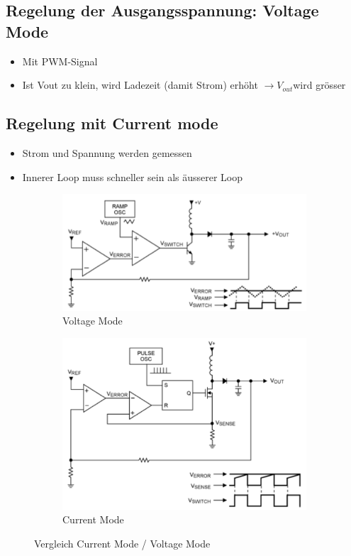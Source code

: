 \subsection{Regelung der Ausgangsspannung: Voltage Mode}
\begin{itemize}
  \item Mit PWM-Signal
  \item Ist Vout zu klein, wird Ladezeit (damit Strom) erhöht $\to V_{out}$wird
  grösser
\end{itemize}

\subsection{Regelung mit Current mode}
\begin{itemize}
  \item Strom und Spannung werden gemessen
  \item Innerer Loop muss schneller sein als äusserer Loop
\end{itemize}

\begin{figure}[h!]
	\centering
	\begin{subfigure}[b]{0.45\textwidth}
		\centering
		\includegraphics[width=\textwidth]{pictures/ausgangsspannungsregelung}
		\caption{Voltage Mode}
	\end{subfigure}
	\qquad
	\begin{subfigure}[b]{0.45\textwidth}
		\centering
		\includegraphics[width=\textwidth]{pictures/currentmode}
		\caption{Current Mode}
	\end{subfigure}
	\caption{Vergleich Current Mode / Voltage Mode}
\end{figure}

